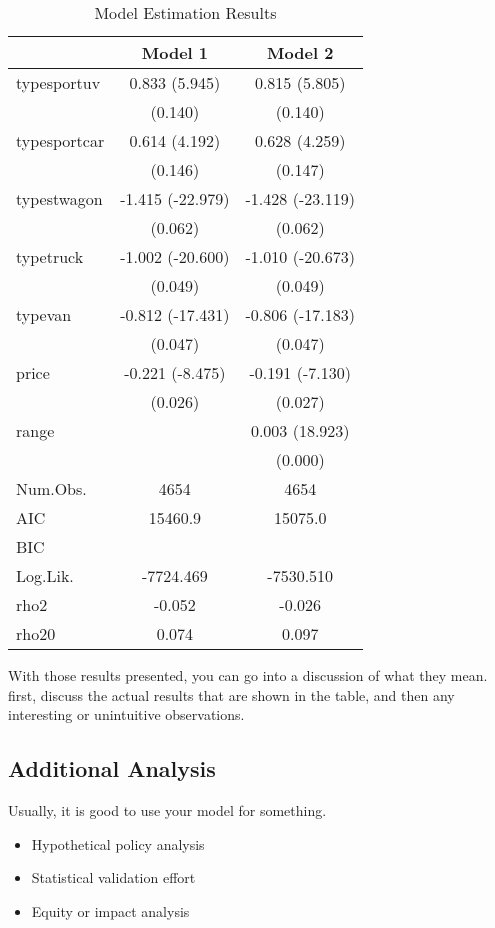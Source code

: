 \documentclass[3p, authoryear]{elsarticle} %
\providecommand{\tightlist}{%
  \setlength{\itemsep}{0pt}\setlength{\parskip}{0pt}}
\begin{document}
\begin{table}

\caption{\label{tab:estimation-results}Model Estimation Results}
\centering
\begin{tabular}[t]{lcc}
\toprule
  & Model 1 & Model 2\\
\midrule
typesportuv & 0.833 (5.945) & 0.815 (5.805)\\
 & (0.140) & (0.140)\\
typesportcar & 0.614 (4.192) & 0.628 (4.259)\\
 & (0.146) & (0.147)\\
typestwagon & -1.415 (-22.979) & -1.428 (-23.119)\\
 & (0.062) & (0.062)\\
typetruck & -1.002 (-20.600) & -1.010 (-20.673)\\
 & (0.049) & (0.049)\\
typevan & -0.812 (-17.431) & -0.806 (-17.183)\\
 & (0.047) & (0.047)\\
price & -0.221 (-8.475) & -0.191 (-7.130)\\
 & (0.026) & (0.027)\\
range &  & 0.003 (18.923)\\
 &  & (0.000)\\
\midrule
Num.Obs. & 4654 & 4654\\
AIC & 15460.9 & 15075.0\\
BIC &  & \\
Log.Lik. & -7724.469 & -7530.510\\
rho2 & -0.052 & -0.026\\
rho20 & 0.074 & 0.097\\
\bottomrule
\end{tabular}
\end{table}

With those results presented, you can go into a discussion of what they mean.
first, discuss the actual results that are shown in the table, and then any
interesting or unintuitive observations.

\hypertarget{additional-analysis}{%
\subsection{Additional Analysis}\label{additional-analysis}}

Usually, it is good to use your model for something.

\begin{itemize}
\tightlist
\item
  Hypothetical policy analysis
\item
  Statistical validation effort
\item
  Equity or impact analysis
\end{itemize}
\end{document}
